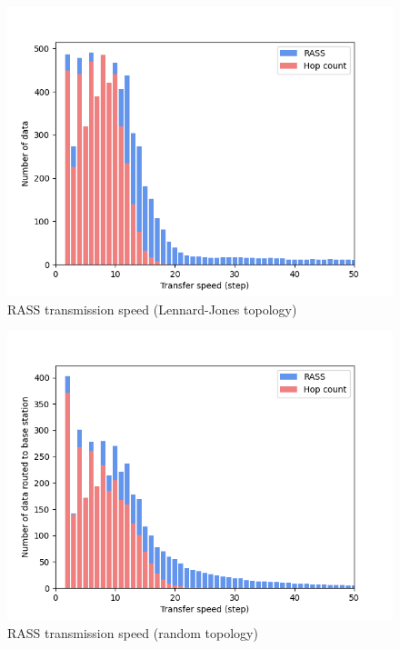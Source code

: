 \begin{figure}
    \includegraphics[width=16cm]{figures/dora_mesh/lennard_speed.png}
        \caption{RASS transmission speed (Lennard-Jones topology)}
        \label{results:lennard_100_speed}
\end{figure}

\begin{figure}
    \centering
    \includegraphics[width=16cm]{figures/dora_mesh/random_speed.png}
    \caption{RASS transmission speed (random topology)}
    \label{results:random_100_speed}
\end{figure}

